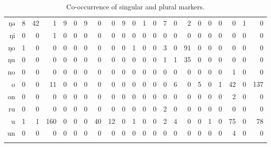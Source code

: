 \begin{table}
\begin{tabular}{rrrrrrrrrrrrrrrrrrrrrr}
      ŋə & 8  & 42 & 1   & 9  & 0  & 9   & 0  & 0    & 9  & 0  & 1 & 0  & 7  & 0  & 2  & 0 & 0  & 0  & 0  & 1  & 0   \\
      ŋi & 0  & 0  & 1   & 0  & 0  & 0   & 0  & 0    & 0  & 0  & 0 & 0  & 0  & 0  & 0  & 0 & 0  & 0  & 0  & 0  & 0   \\
      ŋo & 1  & 0  & 0   & 0  & 0  & 0   & 0  & 0    & 0  & 1  & 0 & 0  & 3  & 0  & 91 & 0 & 0  & 0  & 0  & 0  & 0   \\
      ŋu & 0  & 0  & 0   & 0  & 0  & 0   & 0  & 0    & 0  & 0  & 0 & 0  & 1  & 1  & 35 & 0 & 0  & 0  & 0  & 0  & 0   \\
      no & 0  & 0  & 0   & 0  & 0  & 0   & 0  & 0    & 0  & 0  & 0 & 0  & 0  & 0  & 0  & 0 & 0  & 0  & 1  & 0  & 0   \\
      o  & 0  & 0  & 11  & 0  & 0  & 0   & 0  & 0    & 0  & 0  & 0 & 0  & 0  & 6  & 0  & 5 & 0  & 1  & 42 & 0  & 137 \\
      on & 0  & 0  & 0   & 0  & 0  & 0   & 0  & 0    & 0  & 0  & 0 & 0  & 0  & 0  & 0  & 0 & 0  & 0  & 2  & 0  & 0   \\
      ru & 0  & 0  & 0   & 0  & 0  & 0   & 0  & 0    & 0  & 0  & 0 & 0  & 2  & 0  & 0  & 0 & 0  & 0  & 0  & 0  & 0   \\
      u  & 1  & 1  & 160 & 0  & 0  & 0   & 40 & 12   & 0  & 1  & 0 & 0  & 2  & 4  & 0  & 0 & 1  & 0  & 75 & 0  & 78  \\
      un & 0  & 0  & 0   & 0  & 0  & 0   & 0  & 0    & 0  & 0  & 0 & 0  & 0  & 0  & 0  & 0 & 0  & 0  & 4  & 0  & 0   \\
      \lspbottomrule
    \end{tabular}
    \caption{Co-occurrence of singular and plural markers.}\label{tab:comarkers-kasem}
\end{table}

